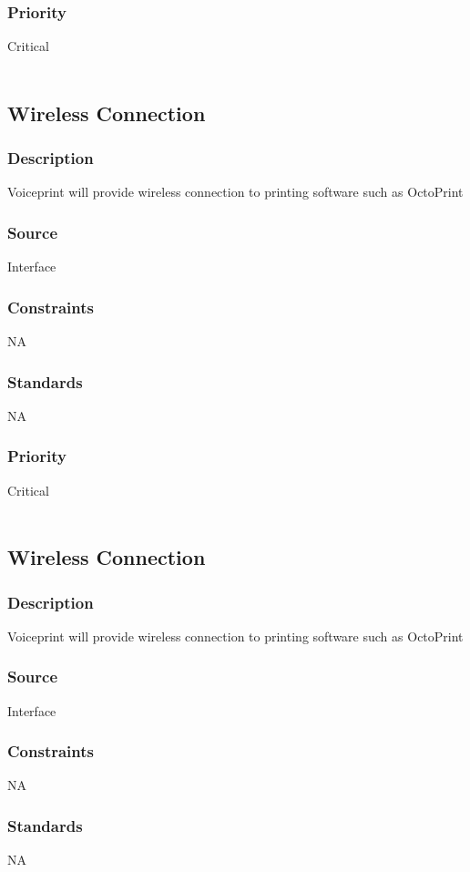 \subsubsection{Priority}
Critical \\
\\
\subsection{Wireless Connection}
\subsubsection{Description}
Voiceprint will provide wireless connection to printing software such as OctoPrint
\subsubsection{Source}
Interface
\subsubsection{Constraints}
NA
\subsubsection{Standards}
NA
\subsubsection{Priority}
Critical \\
\\
\subsection{Wireless Connection}
\subsubsection{Description}
Voiceprint will provide wireless connection to printing software such as OctoPrint
\subsubsection{Source}
Interface
\subsubsection{Constraints}
NA
\subsubsection{Standards}
NA
